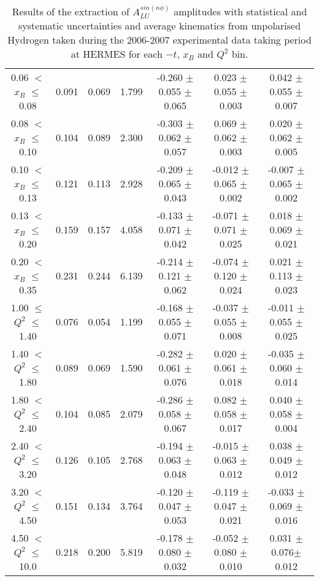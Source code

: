 \begin{table}[width=15cm]
\begin{center}
{\begin{tabular}{|c|c|c|c|c|c|c|}
0.06 $<$ $x_{B}$ $\leqslant$ 0.08 &  0.091 & 0.069 &  1.799 &  -0.260  $\pm$  0.055  $\pm$   0.065 &
0.023 $\pm$  0.055  $\pm$   0.003 & 0.042 $\pm$   0.055  $\pm$   0.007\\
0.08 $<$ $x_{B}$ $\leqslant$ 0.10 &  0.104 & 0.089 &  2.300 &  -0.303 $\pm$  0.062  $\pm$   0.057 &
0.069 $\pm$   0.062  $\pm$   0.003 & 0.020  $\pm$  0.062  $\pm$   0.005\\
0.10 $<$ $x_{B}$ $\leqslant$ 0.13 &  0.121 &  0.113 &  2.928 &  -0.209  $\pm$  0.065   $\pm$  0.043 & 
-0.012  $\pm$  0.065  $\pm$   0.002 & -0.007  $\pm$  0.065  $\pm$   0.002\\
0.13 $<$ $x_{B}$ $\leqslant$ 0.20 &  0.159 & 0.157 &  4.058&  -0.133  $\pm$  0.071  $\pm$   0.042 &
-0.071  $\pm$  0.071  $\pm$   0.025 & 0.018  $\pm$  0.069  $\pm$   0.021 \\
0.20 $<$ $x_{B}$ $\leqslant$ 0.35 &  0.231 & 0.244 &  6.139 &  -0.214 $\pm$ 0.121  $\pm$   0.062 &
-0.074  $\pm$  0.120 $\pm$    0.024 & 0.021  $\pm$  0.113  $\pm$  0.023\\
\hline
1.00 $\leqslant$ $Q^{2}$ $\leqslant$ 1.40 &  0.076 & 0.054  & 1.199 &  -0.168  $\pm$  0.055  $\pm$   0.071 &
-0.037 $\pm$   0.055  $\pm$   0.008 & -0.011  $\pm$  0.055   $\pm$  0.025 \\
1.40 $<$ $Q^{2}$ $\leqslant$ 1.80 &  0.089 & 0.069 &  1.590 &  -0.282 $\pm$  0.061  $\pm$   0.076 &
0.020  $\pm$  0.061  $\pm$   0.018 & -0.035 $\pm$   0.060  $\pm$   0.014\\
1.80 $<$ $Q^{2}$ $\leqslant$ 2.40 &  0.104 & 0.085 &  2.079 &  -0.286 $\pm$   0.058  $\pm$   0.067 &
0.082 $\pm$   0.058  $\pm$   0.017 & 0.040  $\pm$  0.058  $\pm$   0.004\\
2.40 $<$ $Q^{2}$ $\leqslant$ 3.20 &  0.126 & 0.105  & 2.768 &  -0.194 $\pm$   0.063  $\pm$   0.048 &
-0.015  $\pm$  0.063 $\pm$    0.012 & 0.038   $\pm$ 0.049  $\pm$   0.012\\
3.20 $<$ $Q^{2}$ $\leqslant$ 4.50 &  0.151 & 0.134 &  3.764 &  -0.120 $\pm$   0.047  $\pm$   0.053 &
-0.119  $\pm$  0.047 $\pm$    0.021 & -0.033 $\pm$   0.069  $\pm$   0.016\\
4.50 $<$ $Q^{2}$ $\leqslant$ 10.0 &  0.218 & 0.200 &  5.819 &  -0.178  $\pm$  0.080 $\pm$    0.032 &
-0.052  $\pm$  0.080  $\pm$   0.010 & 0.031 $\pm$  0.076$ \pm$  0.012\\
\hline
  \end{tabular}
}
 \end{center}
\caption{Results of the extraction of $A_{LU}^{sin(n\phi)}$ amplitudes with statistical and systematic uncertainties and average kinematics from unpolarised Hydrogen taken during
the 2006-2007 experimental data taking period at HERMES for each $-t$, $x_{B}$ and $Q^{2}$ bin.
}
\end{table}


